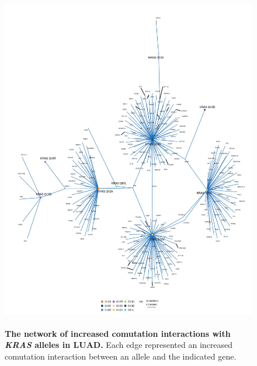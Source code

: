 \documentclass[english, 12pt, letterpaper]{article}
\newcommand{\KRAS}{\emph{KRAS}}
\begin{document}
\begin{figure}[p]
\centering
\includegraphics[height=150mm]{figures/SuppFigure_06.jpeg}
\caption{
    \textbf{The network of increased comutation interactions with \KRAS{} alleles in LUAD.} Each edge represented an increased comutation interaction between an allele and the indicated gene.
}
\label{sfig:luad_labeled-increased-comutation}
\end{figure}
\end{document}
